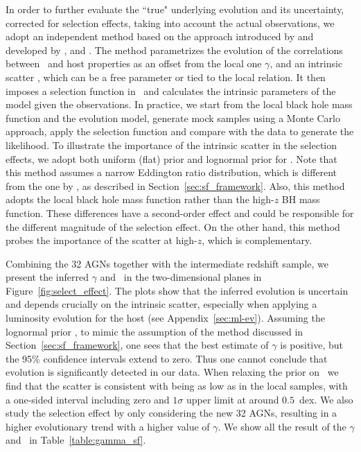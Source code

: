\documentclass[apj]{emulateapj}
\begin{document}
In order to further evaluate the ``true" underlying evolution and its uncertainty, corrected for selection effects, taking into account the actual observations, we adopt an independent method based on the approach introduced by \citet{Tre++07} and developed by \citet{Ben++10}, \citet{Park15} and \citet{Ding2017b}. The method parametrizes the evolution of the correlations between \mbh\ and host properties as an offset from the local one $\gamma$, and an intrinsic scatter \sint, which can be a free parameter or tied to the local relation. It then imposes a selection function in \mbh\ and calculates the intrinsic parameters of the model given the observations. In practice, we start from the local black hole mass function and the evolution model, generate mock samples using a Monte Carlo approach, apply the selection function and compare with the data to generate the likelihood. To illustrate the importance of the intrinsic scatter in the selection effects, we adopt both uniform (flat) prior and lognormal prior for \sint. 
Note that this method assumes a narrow Eddington ratio distribution, which is different from the one by \citet{Schulze2011}, as described in Section~\ref{sec:sf_framework}. Also, this method adopts the local black hole mass function rather than the high-$z$ BH mass function. These differences have a second-order effect and could be responsible for the different magnitude of the selection effect. On the other hand, this method probes the importance of the scatter at high-$z$, which is complementary. %

Combining the 32 AGNs together with the intermediate redshift sample, we present the inferred  $\gamma$ and \sint\ in the two-dimensional planes in Figure~\ref{fig:select_effect}. The plots show that the inferred evolution is uncertain and depends crucially on the intrinsic scatter, especially when applying a luminosity evolution for the host (see Appendix~\ref{sec:ml-ev}). Assuming the lognormal prior \sint, to mimic the assumption of the method discussed in Section~\ref{sec:sf_framework}, one sees that the best estimate of $\gamma$ is positive, but the 95\% confidence intervals extend to zero. Thus one cannot conclude that evolution is significantly detected in our data. 
When relaxing the prior on \sint\ we find that the scatter is consistent with being as low as in the local samples, with a one-sided interval including zero and $1\sigma$ upper limit at around $0.5$~dex. 
We also study the selection effect by only considering the new 32 AGNs, resulting in a higher evolutionary trend with a higher value of $\gamma$. We show all the result of the $\gamma$ and \sint\ in Table~\ref{table:gamma_sf}.
\end{document}
